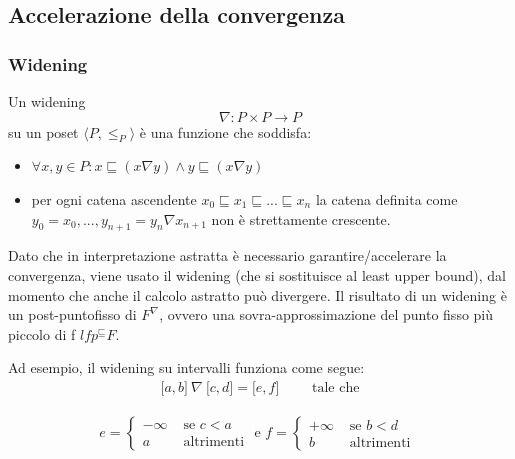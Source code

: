 \documentclass{article}
\begin{document}
        \subsection{Accelerazione della convergenza}
            \subsubsection{Widening}
            Un widening \[ \nabla : P \times P \to P  \] su un poset $ \langle P, \leq_P \rangle $ è una funzione che soddisfa:
            \begin{itemize}
                \item $\forall x,y \in P : x \sqsubseteq (x \nabla y ) \wedge y \sqsubseteq (x \nabla y)$
                \item per ogni catena ascendente $x_0 \sqsubseteq x_1 \sqsubseteq ... \sqsubseteq x_n$ la catena definita come $y_0 = x_0, ..., y_{n+1} = y_n \nabla x_{n+1}$ non è strettamente crescente.
            \end{itemize}
            
            Dato che in interpretazione astratta è necessario garantire/accelerare la convergenza, viene usato il widening (che si sostituisce al least upper bound), dal momento che anche il calcolo astratto può divergere.
            Il risultato di un widening è un post-puntofisso  di $F^\nabla$, ovvero una sovra-approssimazione del punto fisso più piccolo di f $lfp^\sqsubseteq F$. 
            
            Ad esempio, il widening su intervalli funziona come segue:
            \begin{align*}
            \lbrack a, b \rbrack\ \nabla\ \lbrack c, d \rbrack = \lbrack e, f \rbrack \qquad \text{ tale che}
            \end{align*}
            
            \begin{align*}
            e = 
            \begin{cases}
            -\infty &\text{ se } c < a \\
            a &\text{ altrimenti}
            \end{cases}
            \text{ e } f = 
            \begin{cases}
            +\infty &\text{ se } b < d\\
            b &\text{ altrimenti }
            \end{cases}
            \end{align*}
        
\end{document}
